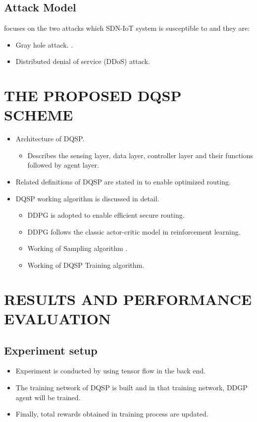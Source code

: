  \subsection{Attack Model}

  \cite{8935210} focuses on the two attacks which SDN-IoT system is susceptible to and they are:

 \begin{itemize}
  \item Gray hole attack. \cite{4449664}.
  \item Distributed denial of service (DDoS) attack.
\end{itemize}

\section{THE PROPOSED DQSP SCHEME}
\begin{itemize}
\item Architecture of DQSP.
\begin{itemize}
\item Describes the sensing layer, data layer, controller layer  and their functions followed by agent layer.
\end{itemize}
\item Related definitions of DQSP are stated in \cite{8935210} to enable optimized routing.
\item DQSP working algorithm is discussed in detail.
\begin{itemize}
\item DDPG is adopted to enable efficient secure routing.
\item DDPG follows the classic actor-critic model in reinforcement learning.
\item Working of Sampling algorithm . 
\item Working of DQSP Training algorithm.
\end{itemize}
\end{itemize}

\section {RESULTS AND PERFORMANCE EVALUATION}
\subsection{Experiment setup}
\begin{itemize}
\item Experiment is conducted by using tensor flow in the back end.
\item The training network of DQSP is built and in that training network, DDGP agent will be trained.
\item Finally, total rewards obtained in training process are updated.
\end{itemize}
